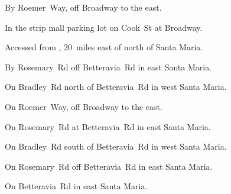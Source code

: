 
\begin{LocationList}

By Roemer~Way, off  Broadway to the east.

In the strip mall parking lot on Cook~St at  Broadway.

Accessed from , 20~miles east of  north of Santa Maria.

By Rosemary~Rd off Betteravia~Rd in east Santa Maria.

On Bradley~Rd north of Betteravia~Rd in west Santa Maria.

\Location{\RecruitmentAgency \Recruitment}
On Roemer~Way, off  Broadway to the east.

On Rosemary~Rd at Betteravia~Rd in east Santa Maria.

On Bradley~Rd south of Betteravia~Rd in west Santa Maria.

On Rosemary~Rd off Betteravia~Rd in east Santa Maria.

\Location{\TruckStop \Gas \Rest}
On Betteravia~Rd in east Santa Maria.

\end{LocationList}
